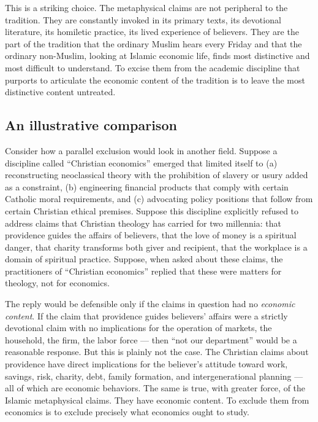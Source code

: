 This is a striking choice. The metaphysical claims are not peripheral
to the tradition. They are constantly invoked in its primary texts,
its devotional literature, its homiletic practice, its lived
experience of believers. They are the part of the tradition that the
ordinary Muslim hears every Friday and that the ordinary
non-Muslim, looking at Islamic economic life, finds most distinctive
and most difficult to understand. To excise them from the academic
discipline that purports to articulate the economic content of the
tradition is to leave the most distinctive content untreated.

\subsection{An illustrative comparison}

Consider how a parallel exclusion would look in another field.
Suppose a discipline called ``Christian economics'' emerged that
limited itself to (a) reconstructing neoclassical theory with the
prohibition of slavery or usury added as a constraint, (b)
engineering financial products that comply with certain Catholic
moral requirements, and (c) advocating policy positions that follow
from certain Christian ethical premises. Suppose this discipline
explicitly refused to address claims that Christian theology has
carried for two millennia: that providence guides the affairs of
believers, that the love of money is a spiritual danger, that
charity transforms both giver and recipient, that the workplace is
a domain of spiritual practice. Suppose, when asked about these
claims, the practitioners of ``Christian economics'' replied that
these were matters for theology, not for economics.

The reply would be defensible only if the claims in question had no
\emph{economic content}. If the claim that providence guides
believers' affairs were a strictly devotional claim with no
implications for the operation of markets, the household, the firm,
the labor force --- then ``not our department'' would be a
reasonable response. But this is plainly not the case. The Christian
claims about providence have direct implications for the believer's
attitude toward work, savings, risk, charity, debt, family
formation, and intergenerational planning --- all of which are
economic behaviors. The same is true, with greater force, of the
Islamic metaphysical claims. They have economic content. To exclude
them from economics is to exclude precisely what economics ought to
study.

